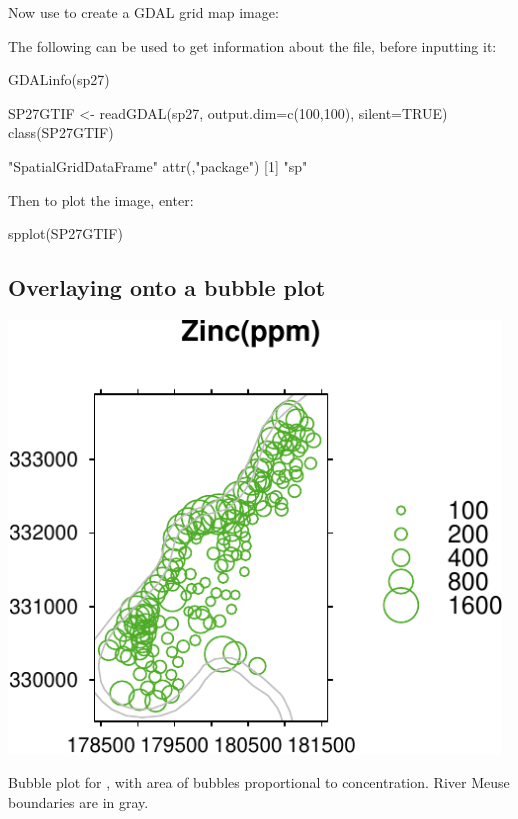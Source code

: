 Now use  to create a GDAL grid map image:
\begin{marginfigure}
The following can be used to get information about the file,
before inputting it:
\begin{Schunk}
\begin{Sinput}
GDALinfo(sp27)
\end{Sinput}
\end{Schunk}
\end{marginfigure}
\begin{Schunk}
\begin{Sinput}
SP27GTIF <- readGDAL(sp27, output.dim=c(100,100),
                     silent=TRUE)
class(SP27GTIF)
\end{Sinput}
\begin{Soutput}
[1] "SpatialGridDataFrame"
attr(,"package")
[1] "sp"
\end{Soutput}
\end{Schunk}
Then to plot the image, enter:
\begin{Schunk}
\begin{Sinput}
spplot(SP27GTIF)
\end{Sinput}
\end{Schunk}

\subsection{Overlaying onto a bubble plot}

\begin{marginfigure}
\begin{Schunk}


\centerline{\includegraphics[width=0.98\textwidth]{figs/10-meuse-bubble-1} }

\end{Schunk}
\vspace*{3pt}
 \caption{Bubble plot for ,
with area of bubbles proportional to concentration.
River Meuse boundaries are in gray.\label{fig:ZnRiv}}
\end{marginfigure}

